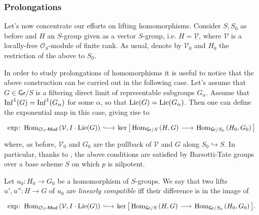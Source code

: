 \subsubsection{Prolongations}
Let's now concentrate our efforts on lifting homomorphisms.
Consider $S, S_0$ as before and
$H$ an $S$-group given as a vector \(S\)-group,
i.e. $H = \underline{\mathcal{V}}$, where $\mathcal{V}$ is a locally-free $\mathcal{O}_{ S }$-module
of finite rank.
As usual, denote by $\mathcal{V}_0$ and $H_0$ the restriction of the above to $S_0$.


\begin{rem}
	In order to study prolongations of homomorphisms it is useful to notice that
	the above construction can be carried out in the following case.
	Let's assume that $G \in \mathsf{Gr}/S$ is a filtering direct limit of
	representable subgroups $G_\alpha$.
	Assume that $\operatorname{Inf}^1(G) = \operatorname{Inf}^1(G_\alpha)$ for some $\alpha$,
	so that $\operatorname{Lie}(G) = \operatorname{Lie}(G_\alpha)$.
	Then one can define the exponential map in this case, giving rise to
	\begin{equation*}
	\begin{tikzcd}[row sep = 0ex, column sep = 1.72em
		,/tikz/column 1/.append style={anchor=base east}
		,/tikz/column 2/.append style={anchor=base west}]
		\exp\colon
		\Hom_{ \mathcal{O}_{ S }\text{-}\mathsf{Mod} }
		\left( \mathcal{V}, I \cdot \lie(G) \right)
		\arrow[r, "", hookrightarrow] &
		\ker \big[ 
		\Hom_{ \mathsf{Gr}/S } 
		\left( H, G \right)
		\arrow[r, "", rightarrow] &
		\Hom_{ \mathsf{Gr}/S_0 }
		\left( H_0, G_0 \right)
		\big]
	\end{tikzcd}
	\end{equation*} 
	where, as before, $\mathcal{V}_0$ and $G_0$ are the pullback of 
	$\mathcal{V}$ and $G$ along $S_0 \hookrightarrow S$.
	In particular, thanks to \cite[Chapter II, Corollary 3.3.16]{Messing},
	the above conditions are satisfied by Barsotti-Tate
	groups over a base scheme $S$ on which $p$ is nilpotent.
\end{rem}


\begin{defn}\label{defn:LinCompProlong}
	Let $u_0\colon H_0 \to G_0$ be a homomorphism of $S$-groups.
	We say that two lifts $u', u''\colon H \to G$ of $u_0$
	are \emph{linearly compatible} iff their difference is in the image
	of 
	\begin{equation*}
	\begin{tikzcd}[row sep = 0ex, column sep = 1.59em
		,/tikz/column 1/.append style={anchor=base east}
		,/tikz/column 2/.append style={anchor=base west}]
		\exp\colon
		\Hom_{ \mathcal{O}_{ S }\text{-}\mathsf{Mod} }
		\left( \mathcal{V}, I \cdot \lie(G) \right)
		\arrow[r, "", hookrightarrow] &
		\ker \big[ 
		\Hom_{ \mathsf{Gr}/S } 
		\left( H, G \right)
		\arrow[r, "", rightarrow] &
		\Hom_{ \mathsf{Gr}/S_0 }
		\left( H_0, G_0 \right)
		\big]
	.\end{tikzcd}
	\end{equation*} 
\end{defn}


